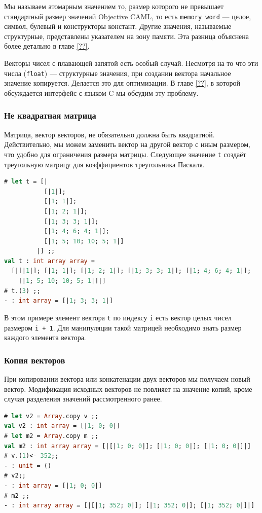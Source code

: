 Мы называем атомарным значением то, размер которого не превышает стандартный
размер значений Objective CAML, то есть \texttt{memory word} --- целое, символ,
булевый и конструкторы констант. Другие значения, называемые структурные,
представлены указателем на зону памяти. Эта разница объяснена более детально в
главе \ref{??}.

Векторы чисел с плавающей запятой есть особый случай. Несмотря на то что эти
числа (\texttt{float}) --- структурные значения, при создании вектора начальное
значение копируется. Делается это для оптимизации. В главе \ref{??}, в которой
обсуждается интерфейс с языком C мы обсудим эту проблему.

\subsubsection{Не квадратная матрица}

Матрица, вектор векторов, не обязательно должна быть квадратной. Действительно,
мы можем заменить вектор на другой вектор с иным размером, что удобно для
ограничения размера матрицы. Следующее значение \texttt{t} создаёт треугольную
матрицу для коэффициентов треугольника Паскаля.

\begin{lstlisting}[language=OCaml]
# let t = [|
           [|1|];
           [|1; 1|];
           [|1; 2; 1|];
           [|1; 3; 3; 1|];
           [|1; 4; 6; 4; 1|];
           [|1; 5; 10; 10; 5; 1|]
         |] ;;
val t : int array array =
  [|[|1|]; [|1; 1|]; [|1; 2; 1|]; [|1; 3; 3; 1|]; [|1; 4; 6; 4; 1|];
    [|1; 5; 10; 10; 5; 1|]|]
# t.(3) ;;
- : int array = [|1; 3; 3; 1|]
\end{lstlisting}

В этом примере элемент вектора \texttt{t} по индексу \texttt{i} есть вектор
целых чисел размером \texttt{i + 1}. Для манипуляции такой матрицей необходимо
знать размер каждого элемента вектора.

\subsubsection{Копия векторов}

При копировании вектора или конкатенации двух векторов мы получаем новый вектор.
Модификация исходных векторов не повлияет на значение копий, кроме случая
разделения значений рассмотренного ранее.

\begin{lstlisting}[language=OCaml]
# let v2 = Array.copy v ;;
val v2 : int array = [|1; 0; 0|]
# let m2 = Array.copy m ;;
val m2 : int array array = [|[|1; 0; 0|]; [|1; 0; 0|]; [|1; 0; 0|]|]
# v.(1)<- 352;;
- : unit = ()
# v2;;
- : int array = [|1; 0; 0|]
# m2 ;;
- : int array array = [|[|1; 352; 0|]; [|1; 352; 0|]; [|1; 352; 0|]|]
\end{lstlisting}

